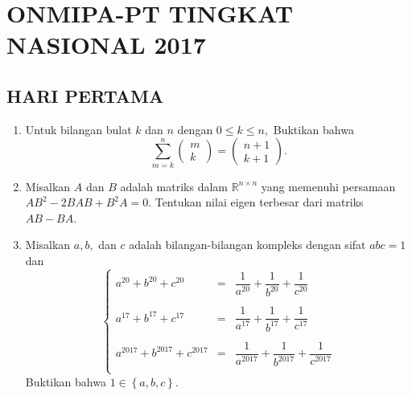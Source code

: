 \documentclass[12pt,twoside]{article}
\begin{document}
\section{ONMIPA-PT TINGKAT NASIONAL 2017}
\subsection{HARI PERTAMA}
\begin{enumerate}
    \item Untuk bilangan bulat $k$ dan $n$ dengan $0 \leq k \leq n,$ Buktikan bahwa
          \begin{equation*}
              \displaystyle\sum_{m=k}^{n} \begin{pmatrix}
                  m \\k
              \end{pmatrix} = \begin{pmatrix}
                  n+1 \\k+1
              \end{pmatrix}.
          \end{equation*}

    \item Misalkan $A$ dan $B$ adalah matriks dalam $\mathbb{R}^{n\times n}$ yang memenuhi persamaan
          $AB^2 - 2BAB+B^2A = 0$.	Tentukan nilai eigen terbesar dari matriks $AB-BA$.


    \item Misalkan $a,b,$ dan $c$ adalah bilangan-bilangan kompleks dengan sifat $abc = 1$ dan
          \begin{equation*}
              \left\lbrace \begin{array}{rcl}
                  a^{20}+b^{20}+c^{20}       & = & \dfrac{1}{a^{20}}+\dfrac{1}{b^{20}}+\dfrac{1}{c^{20}}       \\\\
                  a^{17}+b^{17}+c^{17}       & = & \dfrac{1}{a^{17}}+\dfrac{1}{b^{17}}+\dfrac{1}{c^{17}}       \\\\
                  a^{2017}+b^{2017}+c^{2017} & = & \dfrac{1}{a^{2017}}+\dfrac{1}{b^{2017}}+\dfrac{1}{c^{2017}} \\
              \end{array} \right.
          \end{equation*}
          Buktikan bahwa $1 \in \left\lbrace a,b,c\right\rbrace$.



\end{enumerate}
\end{document}
